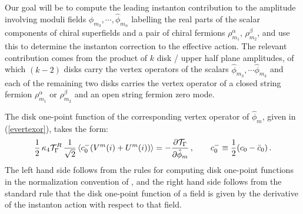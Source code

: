 \documentclass[12pt,a4paper]{article}
\newcommand{\be}{\begin{equation}}
\newcommand{\ee}{\end{equation}}
\newcommand{\refb}[1]{(\ref{#1})}
\newcommand{\p}{\partial}
\newcommand{\cT}{\mathcal{T}}
\def\xxi{\rho}
\begin{document}
Our goal will be to compute the leading instanton contribution
to the amplitude involving moduli fields $\hat\phi_{m_3},\cdots,\hat\phi_{m_n}$
labelling the real parts of the
scalar components of chiral superfields and a pair of chiral fermions $\xxi_{m_1}^\alpha$,
$\xxi_{m_2}^\beta$, and use this to determine the instanton correction to the effective action.
The relevant contribution comes from the product of $k$ disk / upper half plane amplitudes, of which $(k-2)$ disks
carry the vertex operators of the scalars $\hat\phi_{m_3},
\cdots \hat\phi_{m_k}$ and each of the remaining two disks
carries the vertex operator of a closed string fermion $\xxi_{m_1}^\alpha$ or
$\xxi_{m_2}^\beta$ and an open string fermion zero mode.

The disk one-point function of the corresponding vertex
operator of $\hat\phi_m$,  given in \refb{evertexor}, takes
the form:
\be\label{e117a}
{1\over 2} \,\kappa_4 \cT^R_\Gamma\, {1\over \sqrt 2}\, \langle c_0^- (V^{m}(i)+U^{m}(i))\rangle
=  -{\p \cT_\Gamma\over \p \hat\phi_m} \, , \qquad c_0^-\equiv {1\over 2} (c_0-\bar c_0)\, .
\ee
The left hand side follows from the rules for computing disk one-point functions
in the normalization convention of \cite{Alexandrov:2021shf},
and the right hand side follows from the standard
rule that the disk one-point function of a field is given by the derivative of the
instanton action with respect to that field.
\end{document}
